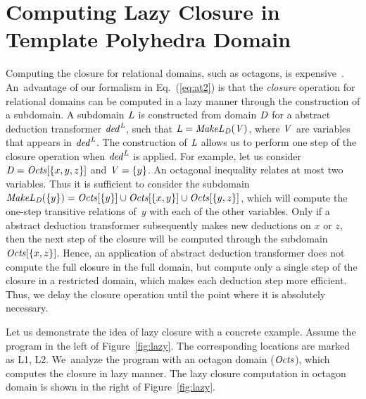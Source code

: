 \section{Computing Lazy Closure in Template Polyhedra Domain}\label{appendix:lazyclosure}
%
Computing the closure for relational domains, such as octagons, is
expensive~\cite{pldi15}.  An~advantage of our formalism in
Eq.~(\ref{eq:at2}) is that the \emph{closure} operation for relational
domains can be computed in a lazy manner through the construction of a
subdomain.  A subdomain $\mathit{L}$ is constructed from domain $\mathit{D}$
for a abstract deduction transformer $\mathit{ded}^{\mathit{L}}$, such that
$\mathit{L}=\mathit{MakeL}_{\mathit{D}}(\mathit{V})$, where $\mathit{V}$ are
variables that appears in $\mathit{ded}^{\mathit{L}}$.  The construction of
$\mathit{L}$ allows us to perform one step of the closure operation when
$\mathit{ded}^{\mathit{L}}$ is applied.
%
For example, let us consider $\mathit{D}=\mathit{Octs}[\{x,y,z\}]$ and
$\mathit{V}=\{y\}$. An octagonal inequality relates at 
most two variables. Thus it is sufficient to consider the subdomain
$\mathit{MakeL}_{\mathit{D}}(\{y\})=\mathit{Octs}[\{y\}]\cup\mathit{Octs}[\{x,y\}]\cup\mathit{Octs}[\{y,z\}]$,
which will compute the one-step transitive relations of~$y$ with each
of the other variables. 
%
Only if a abstract deduction transformer subsequently makes new deductions 
on $x$ or $z$, then the next step of the closure will be computed through 
the subdomain $\mathit{Octs}[\{x,z\}]$.
Hence, an application of abstract deduction transformer does not 
compute the full closure in the full domain, but compute only a 
single step of the closure in a restricted domain, which makes each 
deduction step more efficient.  Thus, we delay the closure operation 
until the point where it is absolutely necessary.  
%

Let us demonstrate the idea of lazy closure with a concrete example.  Assume
the program in the left of Figure~\ref{fig:lazy}.  The corresponding
locations are marked as L1, L2.  We~analyze the program with an octagon
domain ($\mathit{Octs}$), which computes the closure in lazy manner.  The lazy
closure computation in octagon domain is shown in the right of
Figure~\ref{fig:lazy}.

